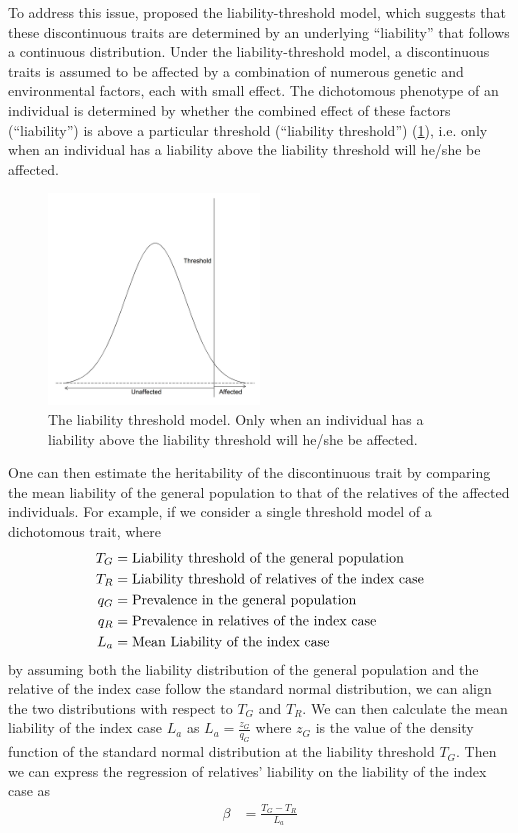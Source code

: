 	To address this issue, \citet{Falconer1965} proposed the liability-threshold model, which suggests that these discontinuous traits are determined by an underlying ``liability'' that follows a continuous distribution.
	Under the liability-threshold model, a discontinuous traits is assumed to be affected by a combination of numerous genetic and environmental factors, each with small effect.
	The dichotomous phenotype of an individual is determined by whether the combined effect of these factors (``liability'') is above a particular threshold (``liability threshold'') (\cref{fig:liability}), i.e. only when an individual has a liability above the liability threshold will he/she be affected.
	\begin{figure}
		\centering
		\includegraphics[width=0.5\textwidth]{figure/liability.png}
		\caption[Liability Threshold Model]{
			The liability threshold model.
			Only when an individual has a liability above the liability threshold will he/she be affected.
			}
			\label{fig:liability}
	\end{figure}
	One can then estimate the heritability of the discontinuous trait by comparing the mean liability of the general population to that of the relatives of the affected individuals.	
	For example, if we consider a single threshold model of a dichotomous trait, where 
	\begin{align}
	T_G &= \text{Liability threshold of the general population}\notag\\
	T_R &= \text{Liability threshold of relatives of the index case} \notag\\
	q_G &= \text{Prevalence in the general population}\notag\\
	q_R &= \text{Prevalence in relatives of the index case}\notag\\
	L_a &= \text{Mean Liability of the index case} \notag
	\end{align}
	by assuming both the liability distribution of the general population and the relative of the index case follow the standard normal distribution, we can align the two distributions with respect to $T_G$ and $T_R$. 
	We can then calculate the mean liability of the index case $L_a$ as $L_a=\frac{z_G}{q_G}$ where $z_G$ is the value of the density function of the standard normal distribution at the liability threshold $T_G$.
	Then we can express the regression of relatives' liability on the liability of the index case as
	\begin{align}
	\beta &= \frac{T_G-T_R}{L_a}
	\label{eq:liability}
	\end{align}
	

